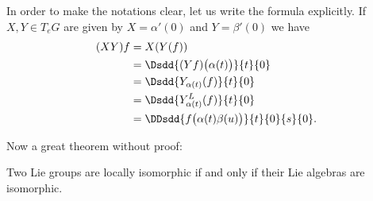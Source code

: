 In order to make the notations clear, let us write the formula explicitly. If \( X,Y\in T_eG\) are given by \( X=\alpha'(0)\) and \( Y=\beta'(0)\) we have
\begin{subequations}        \label{SUBEQSooHKWMooQbeStl}
	\begin{align}
		(XY)f & =X(Y(f))                                               \\
		      & =\Dsdd{ (Yf)\big( \alpha(t) \big) }{t}{0}              \\
		      & =\Dsdd{ Y_{\alpha(t)}(f) }{t}{0}                       \\
		      & =\Dsdd{ Y^L_{\alpha(t)}(f) }{t}{0}                     \\
		      & =\DDsdd{ f\big( \alpha(t)\beta(u) \big) }{t}{0}{s}{0}.
	\end{align}
\end{subequations}

Now a great theorem without proof:
\begin{theorem} \label{tho:loc_isom}
	Two Lie groups are locally isomorphic if and only if their Lie algebras are isomorphic.
\end{theorem}

